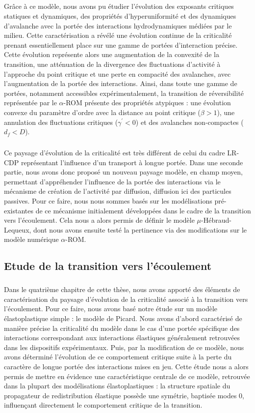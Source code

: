 \subparagraph{}Grâce à ce modèle, nous avons pu étudier l'évolution des exposants critiques statiques et dynamiques, des propriétés d'hyperuniformité et des dynamiques d'avalanche avec la portée des interactions hydrodynamiques médiées par le milieu. Cette caractérisation a révélé une évolution continue de la criticalité prenant essentiellement place sur une gamme de portées d'interaction précise. Cette évolution représente alors une augmentation de la convexité de la transition, une atténuation de la divergence des fluctuations d'activité à l'approche du point critique et une perte en compacité des avalanches, avec  l'augmentation de la portée des interactions. Ainsi, dans toute une gamme de portées, notamment accessibles expérimentalement, la transition de réversibilité représentée par le $\alpha$-ROM présente des propriétés atypiques : une évolution convexe du paramètre d'ordre avec la distance au point critique ($\beta > 1$), une annulation des fluctuations critiques ($\gamma^\prime < 0$) et des avalanches non-compactes ($d_f < D$).

\subparagraph{}Ce paysage d'évolution de la criticalité est très différent de celui du cadre LR-CDP représentant l'influence d'un transport à longue portée. Dans une seconde partie, nous avons donc proposé un nouveau paysage modèle, en champ moyen, permettant d'appréhender l'influence de la portée des interactions via le mécanisme de création de l'activité par diffusion, diffusion ici des particules passives. Pour ce faire, nous nous sommes basés sur les modélisations pré-existantes de ce mécanisme initialement développées dans le cadre de la transition vers l'écoulement. Cela nous a alors permis de définir le modèle $\mu$-Hébraud-Lequeux, dont nous avons ensuite testé la pertinence via des modifications sur le modèle numérique $\alpha$-ROM.

\subsection*{Etude de la transition vers l'écoulement}

\subparagraph{}Dans le quatrième chapitre de cette thèse, nous avons apporté des éléments de caractérisation du paysage d'évolution de la criticalité associé à la transition vers l'écoulement. Pour ce faire, nous avons basé notre étude sur un modèle élastoplastique simple : le modèle de Picard. Nous avons d'abord caractérisé de manière précise la criticalité du modèle dans le cas d'une portée spécifique des interactions correspondant aux interactions élastiques généralement retrouvées dans les dispositifs expérimentaux. Puis, par la modification de ce modèle, nous avons déterminé l'évolution de ce comportement critique suite à la perte du caractère de longue portée des interactions mises en jeu. Cette étude nous a alors permis de mettre en évidence une caractéristique centrale de ce modèle, retrouvée dans la plupart des modélisations élastoplastiques : la structure spatiale du propagateur de redistribution élastique possède une symétrie, baptisée modes 0, influençant directement le comportement critique de la transition. 

